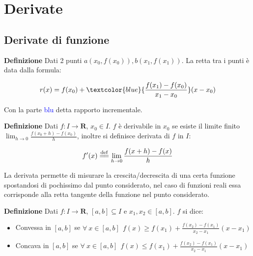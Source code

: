 \documentclass{article}
\newcommand{\defeq}{\overset{\mathrm{def}}{=\joinrel=}}
\begin{document}
\section{Derivate}

\subsection{Derivate di funzione}

\textbf{Definizione} Dati 2 punti $a(x_0,f(x_0)),b(x_1,f(x_1))$. La retta tra i punti è data dalla formula:

$$r(x)=f(x_0)+\textcolor{blue}{\frac{f(x_1)-f(x_0)}{x_1-x_0}}(x-x_0)$$

\noindent Con la parte \textcolor{blue}{blu} detta rapporto incrementale.\newline

\noindent\textbf{Definizione} Dati $f:I\rightarrow\mathbf{R}$, $x_0\in I$. $f$ è derivabile in $x_0$ se esiste il limite finito $\lim_{h\rightarrow0}\frac{f(x_0+h)-f(x_0)}{h}$, inoltre si definisce derivata di $f$ in $I$:

$$f'(x)\defeq\lim_{h\rightarrow0}\frac{f(x+h)-f(x)}{h}$$\newline

\noindent La derivata permette di misurare la crescita/decrescita di una certa funzione spostandosi di pochissimo dal punto considerato, nel caso di funzioni reali essa corrisponde alla retta tangente della funzione nel punto considerato.\newline

\noindent

\noindent\textbf{Definizione} Dati $f:I\rightarrow\mathbf{R}$, $[a,b]\subseteq I$ e $x_1,x_2\in[a,b]$. $f$ si dice:
\begin{itemize}
    \item Convessa in $[a,b]$ se $\forall\ x\in[a,b]\ \ f(x)\geq f(x_1)+\frac{f(x_2)-f(x_1)}{x_2-x_1}(x-x_1)$

    \item Concava in $[a,b]$ se $\forall\ x\in[a,b]\ \ f(x)\leq f(x_1)+\frac{f(x_2)-f(x_1)}{x_2-x_1}(x-x_1)$\newline
\end{itemize}
\end{document}
